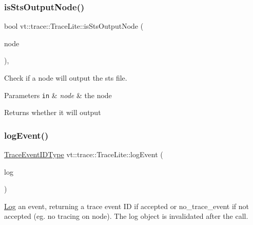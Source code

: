 \subsubsection{\texorpdfstring{is\+Sts\+Output\+Node()}{isStsOutputNode()}}
{\footnotesize\ttfamily bool vt\+::trace\+::\+Trace\+Lite\+::is\+Sts\+Output\+Node (\begin{DoxyParamCaption}\item[{\hyperlink{namespacevt_a866da9d0efc19c0a1ce79e9e492f47e2}{Node\+Type}}]{node }\end{DoxyParamCaption})\hspace{0.3cm}{\ttfamily [static]}, {\ttfamily [protected]}}



Check if a node will output the sts file. 


\begin{DoxyParams}[1]{Parameters}
\mbox{\tt in}  & {\em node} & the node\\
\hline
\end{DoxyParams}
\begin{DoxyReturn}{Returns}
whether it will output 
\end{DoxyReturn}
\mbox{\label{structvt_1_1trace_1_1_trace_lite_aeb468f1222761674e4ffb0cfa27f0641}} 
\subsubsection{\texorpdfstring{log\+Event()}{logEvent()}}
{\footnotesize\ttfamily \hyperlink{namespacevt_1_1trace_a64a7185f3e102df8d8258f263ccd1582}{Trace\+Event\+I\+D\+Type} vt\+::trace\+::\+Trace\+Lite\+::log\+Event (\begin{DoxyParamCaption}\item[{\hyperlink{structvt_1_1trace_1_1_trace_lite_aeb73e523d31829d3163c877b145afa2a}{Log\+Type} \&\&}]{log }\end{DoxyParamCaption})\hspace{0.3cm}{\ttfamily [protected]}}



\hyperlink{structvt_1_1trace_1_1_log}{Log} an event, returning a trace event ID if accepted or {\ttfamily no\+\_\+trace\+\_\+event} if not accepted (eg. no tracing on node). The log object is invalidated after the call. 


